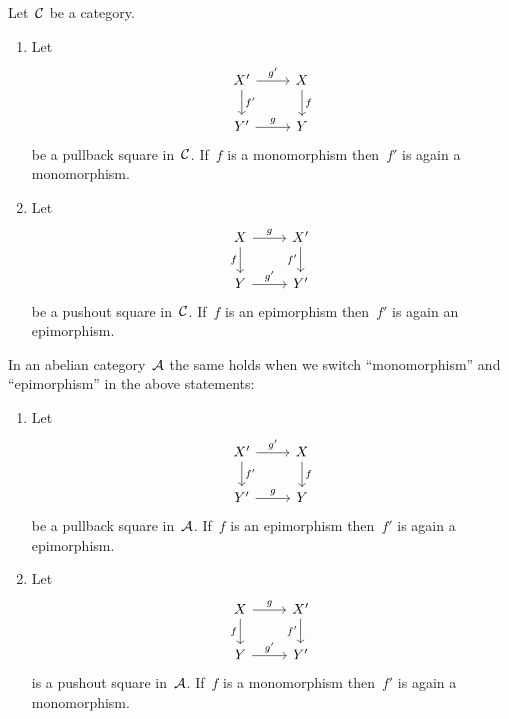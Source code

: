 \begin{proposition*}
  \label{mono epi under pull push}
  Let~$\mathcal{C}$ be a category.
  \begin{enumerate}
    \item
      \label{pullback of mono}
      Let
      \[
        \begin{tikzcd}
            X'
            \arrow{r}[above]{g'}
            \arrow{d}[right]{f'}
          & X
            \arrow{d}[right]{f}
          \\
            Y'
            \arrow{r}[above]{g}
          & Y
        \end{tikzcd}
      \]
      be a pullback square in~$\mathcal{C}$.
      If~$f$ is a monomorphism then~$f'$ is again a monomorphism.
    \item
      Let
      \[
        \begin{tikzcd}
            X
            \arrow{r}[above]{g}
            \arrow{d}[left]{f}
          & X'
            \arrow{d}[left]{f'}
          \\
            Y
            \arrow{r}[above]{g'}
          & Y'
        \end{tikzcd}
      \]
      be a pushout square in~$\mathcal{C}$.
      If~$f$ is an epimorphism then~$f'$ is again an epimorphism.
  \end{enumerate}
  In an abelian category~$\mathcal{A}$ the same holds when we switch \enquote{monomorphism} and \enquote{epimorphism} in the above statements:
  \begin{enumerate}[resume]
    \item
      \label{pullback of epi}
      Let
      \[
        \begin{tikzcd}
            X'
            \arrow{r}[above]{g'}
            \arrow{d}[right]{f'}
          & X
            \arrow{d}[right]{f}
          \\
            Y'
            \arrow{r}[above]{g}
          & Y
        \end{tikzcd}
      \]
      be a pullback square in~$\mathcal{A}$.
      If~$f$ is an epimorphism then~$f'$ is again a epimorphism.
    \item
      \label{pushout of mono}
      Let
      \[
        \begin{tikzcd}
            X
            \arrow{r}[above]{g}
            \arrow{d}[left]{f}
          & X'
            \arrow{d}[left]{f'}
          \\
            Y
            \arrow{r}[above]{g'}
          & Y'
        \end{tikzcd}
      \]
      is a pushout square in~$\mathcal{A}$.
      If~$f$ is a monomorphism then~$f'$ is again a monomorphism.
  \end{enumerate}
\end{proposition*}


